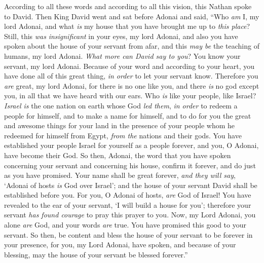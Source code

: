 \begin{biblechapter}
 According to all these words and according to all this vision, this Nathan spoke to David.
\verse Then King David went and sat before Adonai and said, “Who \textit{am} I, my lord Adonai, and what \textit{is} my house that you have brought me up to \textit{this place}?
\verse Still, this \textit{was} \textit{insignificant} in your eyes, my lord Adonai, and also you have spoken about the house of your servant from afar, and this \textit{may be} the teaching of humans, my lord Adonai.
\verse \textit{What more can David say to you}? You know your servant, my lord Adonai.
\verse Because of your word and according to your heart, you have done all of this great thing, \textit{in order} to let your servant know.
\verse Therefore you \textit{are} great, my lord Adonai, for there is no one like you, and there \textit{is} no god except you, in all that we have heard with our ears.
\verse Who \textit{is} like your people, like Israel? \textit{Israel is} the one nation on earth whose God \textit{led them}, \textit{in order} to redeem a people for himself, and to make a name for himself, and to do for you the great and awesome things for your land in the presence of your people whom he redeemed for himself from Egypt, \textit{from the} nations and their gods.
\verse You have established your people Israel for yourself as a people forever, and you, O Adonai, have become their God.
\verse So then, Adonai, the word that you have spoken concerning your servant and concerning his house, confirm it forever, and do just as you have promised.
\verse Your name shall be great forever, \textit{and they will say}, ‘Adonai of hosts \textit{is} God over Israel’; and the house of your servant David shall be established before you.
\verse For you, O Adonai of hosts, \textit{are} God of Israel! You have revealed to the ear of your servant, ‘I will build a house for you’; therefore your servant \textit{has found courage} to pray this prayer to you.
\verse Now, my Lord Adonai, you alone \textit{are} God, and your words \textit{are} true. You have promised this good to your servant.
\verse So then, be content and bless the house of your servant to be forever in your presence, for you, my Lord Adonai, have spoken, and because of your blessing, may the house of your servant be blessed forever.”
\end{biblechapter}

